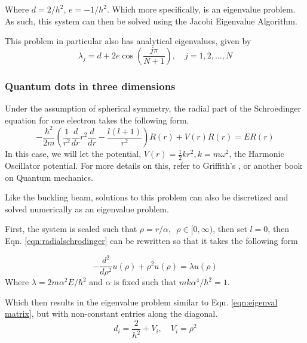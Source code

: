 \documentclass[10pt,showpacs,preprintnumbers,footinbib,amsmath,amssymb,aps,prl,twocolumn,groupedaddress,superscriptaddress,showkeys]{revtex4-1}
\begin{document}
    Where $d=2/h^2$, $e=-1/h^2$.
    Which more specifically, is an eigenvalue problem. As such, this system can then be solved
    using the Jacobi Eigenvalue Algorithm. \cite{question_text}

    This problem in particular also has analytical eigenvalues, given by
    \begin{equation}
      \label{eqn:analytic eigenvals}
      \lambda_j = d + 2e\cos\left( \frac{j\pi}{N+1} \right), \quad j=1, 2, \dots, N
    \end{equation}


  \subsubsection{Quantum dots in three dimensions}
    Under the assumption of spherical symmetry, the radial part of the Schroedinger equation for one electron takes 
    the following form.
    \begin{equation}
      \label{eqn:radialschrodinger}
      -\frac{\hbar^2}{2m}\left( \frac{1}{r^2}\frac{d}{dr}r^2\frac{d}{dr} - \frac{l(l+1)}{r^2} \right)
      R(r) + V(r)R(r) = ER(r)
    \end{equation}
    In this case, we will let the potential, $V(r)=\frac{1}{2}kr^2, k=m\omega^2$, the Harmonic Oscillator potential.
    For more details on this, refer to Griffith's \cite{griffiths}, or another book on Quantum mechanics.

    Like the buckling beam, solutions to this problem can also be discretized and solved numerically as an eigenvalue
    problem.

    First, the system is scaled such that $\rho = r/\alpha,\enspace \rho \in [0, \infty)$, then set $l=0$, then Eqn. \ref{eqn:radialschrodinger} can be rewritten so that it takes the following form \cite{question_text}

    \begin{equation}
      \label{eqn:1electron_para}
      -\frac{d^2}{d\rho^2} u(\rho) + \rho^2 u(\rho) = \lambda u(\rho)
    \end{equation}
    Where $\lambda = 2m\alpha^2E /\hbar^2$ and $\alpha$ is fixed such that $mk\alpha^4/\hbar^2=1$.

    Which then results in the eigenvalue problem similar to Eqn. \ref{eqn:eigenval matrix}, but with non-constant entries along the diagonal. 
    \begin{equation}
      d_i = \frac{2}{h^2} + V_i, \quad V_i = \rho^2
    \end{equation}
\end{document}
